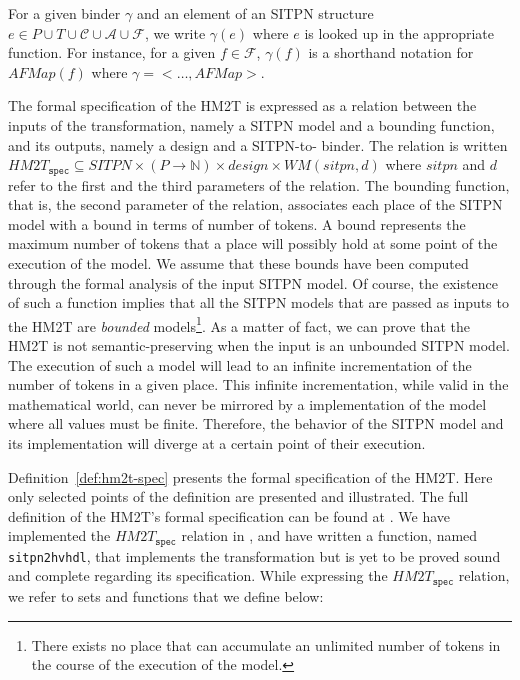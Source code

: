 For a given binder $\gamma$ and an element of an SITPN structure
$e\in{}P\cup{}T\cup\mathcal{C}\cup\mathcal{A}\cup\mathcal{F}$, we
write $\gamma(e)$ where $e$ is looked up in the appropriate
function. For instance, for a given $f\in\mathcal{F}$, $\gamma(f)$ is
a shorthand notation for $AFMap(f)$ where $\gamma={<}\dots,AFMap{>}$.

\bigskip

The formal specification of the HM2T is expressed as a relation
between the inputs of the transformation, namely a SITPN model and a
bounding function, and its outputs, namely a \hvhdl{} design and a
SITPN-to-\hvhdl{} binder. The relation is written
$HM2T_{\mathtt{spec}}\subseteq{}SITPN\times(P\rightarrow\mathbb{N})\times{}design\times{}WM(sitpn,d)$
where $sitpn$ and $d$ refer to the first and the third parameters of
the relation.  The bounding function, that is, the second parameter of
the relation, associates each place of the SITPN model with a bound in
terms of number of tokens.  A bound represents the maximum number of
tokens that a place will possibly hold at some point of the execution
of the model. We assume that these bounds have been computed through
the formal analysis of the input SITPN model. Of course, the existence
of such a function implies that all the SITPN models that are passed
as inputs to the HM2T are \textit{bounded} models\footnote{There
  exists no place that can accumulate an unlimited number of tokens in
  the course of the execution of the model.}. As a matter of fact, we
can prove that the HM2T is not semantic-preserving when the input is
an unbounded SITPN model. The execution of such a model will lead to
an infinite incrementation of the number of tokens in a given
place. This infinite incrementation, while valid in the mathematical
world, can never be mirrored by a \vhdl{} implementation of the model
where all values must be finite. Therefore, the behavior of the SITPN
model and its \hvhdl{} implementation will diverge at a certain point
of their execution.

\bigskip

Definition~\ref{def:hm2t-spec} presents the formal specification of
the HM2T. Here only selected points of the definition are presented
and illustrated. The full definition of the HM2T's formal
specification can be found at . We have implemented the
$HM2T_{\mathtt{spec}}$ relation in \coq{}, and have written a \coq{}
function, named \texttt{sitpn2hvhdl}, that implements the
transformation but is yet to be proved sound and complete regarding
its specification. %
While expressing the $HM2T_{\mathtt{spec}}$ relation, we refer to sets
and functions that we define below:\\

